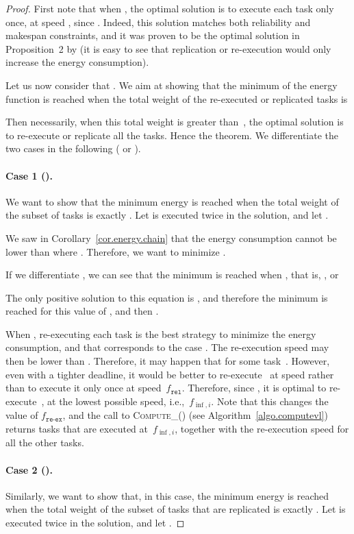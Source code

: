 \documentclass[a4paper]{article}
\theoremstyle{plain}
\theoremstyle{definition}
\theoremstyle{remark}
\newcommand{\finf}{\ensuremath{f_{\inf,i}}\xspace}
\newcommand{\fr}{\ensuremath{f_{\texttt{rel}}}\xspace}
\newcommand{\freex}{\ensuremath{f_{\texttt{re-ex}}}\xspace}
\newcommand{\computeVl}{\textsc{Compute\_}}
\begin{document}
\begin{proof}
  First note that when , the optimal solution is
  to execute each task only once, at speed , since . Indeed, this solution matches both reliability and
  makespan constraints, and it was proven to be the optimal solution
  in Proposition~2 by \cite{aupy12ccpe} (it is easy to see that
  replication or re-execution would only increase the energy
  consumption).

  Let us now consider that . We aim at showing
  that the minimum of the energy function is reached when the total
  weight of the re-executed or replicated tasks is

Then necessarily, when this total weight is greater than~, the
optimal solution is to re-execute or replicate all the tasks. Hence
the theorem. We differentiate the two cases in the following ( or
).

\paragraph{Case 1 (). }
We want to show that the minimum energy is reached when the total
weight of the subset of tasks is exactly . Let  is executed twice in the solution, and let
.

We saw in Corollary~\ref{cor.energy.chain} that the energy consumption
cannot be lower than  where .  Therefore, we want to minimize .

If we differentiate , we can see that the minimum is reached when 
,
 that is, 
 , or 
 
The only positive solution to this equation is , and
therefore the minimum is reached for this value of , and
then . 

When , re-executing each task is the best strategy to
minimize the energy consumption, and that corresponds to the case . The re-execution speed may then be
lower than . Therefore, it may happen that  for some task~. However, even with a tighter deadline, it
would be better to re-execute~ at speed 
rather than to execute it only once at speed~\fr. Therefore, since
, it is optimal to re-execute~, at
the lowest possible speed, i.e.,~\finf. Note that this changes the
value of \freex, and the call to \mbox{\computeVl()} (see
Algorithm~\ref{algo.computevl}) returns tasks that are executed
at~\finf, together with the re-execution speed for all the other tasks.



\paragraph{Case 2 (). }
Similarly, we want to show that, in this case, the minimum energy is
reached when the total weight of the subset of tasks that are
replicated is exactly . Let  is executed
twice in the solution, and let .


\end{proof}
\end{document}
